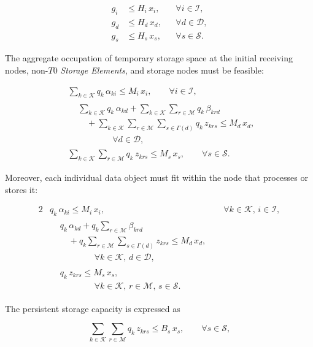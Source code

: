 \documentclass[a4paper,fleqn]{cas-dc}
\newcommand{\Iset}{\mathcal{I}}
\newcommand{\Dset}{\mathcal{D}}
\newcommand{\Sset}{\mathcal{S}}
\newcommand{\Kset}{\mathcal{K}}
\newcommand{\Mset}{\mathcal{M}}
\begin{document}
\begin{align}
g_i &\le H_i\,x_i,
&& \forall i\in\Iset,\\
g_d &\le H_d\,x_d,
&& \forall d\in\Dset,\\
g_s &\le H_s\,x_s,
&& \forall s\in\Sset.
\end{align}


The aggregate occupation of temporary storage space at the initial receiving nodes, non-\(T0\) \emph{Storage Elements}, and storage nodes must be feasible:


\begin{align}
&\sum_{k\in\Kset} q_k\,\alpha_{ki} \le M_i\,x_i,
\qquad \forall i\in\Iset,\\[2ex]
&\!\begin{aligned}
  &\sum_{k\in\Kset} q_k\,\alpha_{kd} 
   + \sum_{k\in\Kset}\sum_{r\in\Mset} q_k\,\beta_{krd} \\
  &\quad + \sum_{k\in\Kset}\sum_{r\in\Mset}\sum_{s\in\Gamma(d)} q_k\,z_{krs} \le M_d\,x_d, \\
  &\qquad\qquad \forall d\in\Dset,
\end{aligned}\\[2ex]
&\sum_{k\in\Kset}\sum_{r\in\Mset} q_k\,z_{krs} \le M_s\,x_s,
\qquad \forall s\in\Sset.
\end{align}


Moreover, each individual data object must fit within the node that processes or stores it:

\begin{alignat}{2}
&q_k\,\alpha_{ki} \le M_i\,x_i,
&& \forall k\in\Kset,\, i\in\Iset,\\[2ex]
&\!\begin{aligned}
  &q_k\,\alpha_{kd} + q_k\sum_{r\in\Mset} \beta_{krd} \\
  &\quad + q_k\sum_{r\in\Mset}\sum_{s\in\Gamma(d)} z_{krs} \le M_d\,x_d, \\
  &\qquad\qquad \forall k\in\Kset,\, d\in\Dset,
\end{aligned} && \\[2ex]
&\!\begin{aligned}
  &q_k\,z_{krs} \le M_s\,x_s, \\
  &\qquad\qquad \forall k\in\Kset,\, r\in\Mset,\, s\in\Sset.
\end{aligned} &&
\end{alignat}


The persistent storage capacity is expressed as

\begin{equation}
\sum_{k\in\Kset}\sum_{r\in\Mset} q_k\,z_{krs} \le B_s\,x_s,
\qquad \forall s\in\Sset,
\end{equation}
\end{document}
